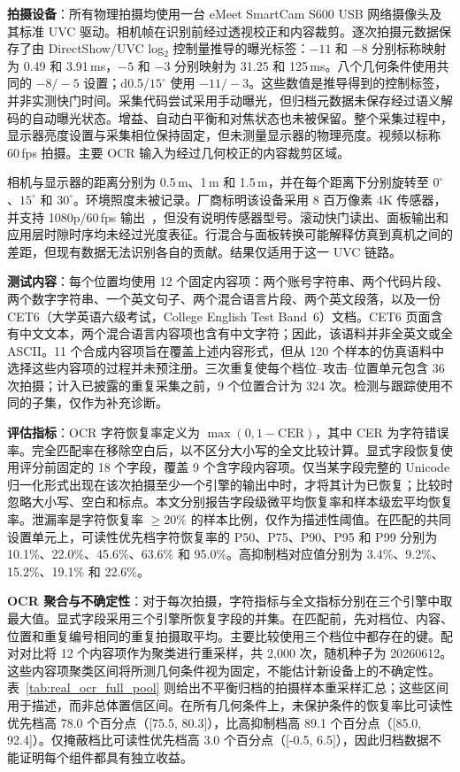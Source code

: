 \textbf{拍摄设备}：所有物理拍摄均使用一台 eMeet SmartCam S600 USB 网络摄像头及其标准 UVC 驱动。相机帧在识别前经过透视校正和内容裁剪。逐次拍摄元数据保存了由 DirectShow/UVC log$_2$ 控制量推导的曝光标签：$-11$ 和 $-8$ 分别标称映射为 0.49 和 3.91\,ms，$-5$ 和 $-3$ 分别映射为 31.25 和 125\,ms。八个几何条件使用共同的 $-8/-5$ 设置；d0.5/$15^{\circ}$ 使用 $-11/-3$。这些数值是推导得到的控制标签，并非实测快门时间。采集代码尝试采用手动曝光，但归档元数据未保存经过语义解码的自动曝光状态。增益、自动白平衡和对焦状态也未被保留。整个采集过程中，显示器亮度设置与采集相位保持固定，但未测量显示器的物理亮度。视频以标称 60\,fps 拍摄。主要 OCR 输入为经过几何校正的内容裁剪区域。

相机与显示器的距离分别为 0.5\,m、1\,m 和 1.5\,m，并在每个距离下分别旋转至 $0^{\circ}$、$15^{\circ}$ 和 $30^{\circ}$。环境照度未被记录。厂商标明该设备采用 8 百万像素 4K 传感器，并支持 1080p/60\,fps 输出~\cite{b_emeet_s600}，但没有说明传感器型号。滚动快门读出、面板输出和应用层时隙时序均未经过光度表征。行混合与面板转换可能解释仿真到真机之间的差距，但现有数据无法识别各自的贡献。结果仅适用于这一 UVC 链路。

\textbf{测试内容}：每个位置均使用 12 个固定内容项：两个账号字符串、两个代码片段、两个数字字符串、一个英文句子、两个混合语言片段、两个英文段落，以及一份 CET6（大学英语六级考试，College English Test Band~6）文档。CET6 页面含有中文文本，两个混合语言内容项也含有中文字符；因此，该语料并非全英文或全 ASCII。11 个合成内容项旨在覆盖上述内容形式，但从 120 个样本的仿真语料中选择这些内容项的过程并未预注册。三次重复使每个档位--攻击--位置单元包含 36 次拍摄；计入已披露的重复采集之前，9 个位置合计为 324 次。检测与跟踪使用不同的子集，仅作为补充诊断。

\textbf{评估指标}：OCR 字符恢复率定义为 $\max(0,1-\mathrm{CER})$，其中 CER 为字符错误率。完全匹配率在移除空白后，以不区分大小写的全文比较计算。显式字段恢复使用评分前固定的 18 个字段，覆盖 9 个含字段内容项。仅当某字段完整的 Unicode 归一化形式出现在该次拍摄至少一个引擎的输出中时，才将其计为已恢复；比较时忽略大小写、空白和标点。本文分别报告字段级微平均恢复率和样本级宏平均恢复率。泄漏率是字符恢复率 $\geq20\%$ 的样本比例，仅作为描述性阈值。在匹配的共同设置单元上，可读性优先档字符恢复率的 P50、P75、P90、P95 和 P99 分别为 10.1\%、22.0\%、45.6\%、63.6\% 和 95.0\%。高抑制档对应值分别为 3.4\%、9.2\%、15.2\%、19.1\% 和 22.6\%。

\textbf{OCR 聚合与不确定性}：对于每次拍摄，字符指标与全文指标分别在三个引擎中取最大值。显式字段采用三个引擎所恢复字段的并集。在匹配前，先对档位、内容、位置和重复编号相同的重复拍摄取平均。主要比较使用三个档位中都存在的键。配对对比将 12 个内容项作为聚类进行重采样，共 2,000 次，随机种子为 20260612。这些内容项聚类区间将所测几何条件视为固定，不能估计新设备上的不确定性。表~\ref{tab:real_ocr_full_pool} 则给出不平衡归档的拍摄样本重采样汇总；这些区间用于描述，而非总体置信区间。在所有几何条件上，未保护条件的恢复率比可读性优先档高 78.0 个百分点（[75.5, 80.3]），比高抑制档高 89.1 个百分点（[85.0, 92.4]）。仅掩蔽档比可读性优先档高 3.0 个百分点（[-0.5, 6.5]），因此归档数据不能证明每个组件都具有独立收益。

